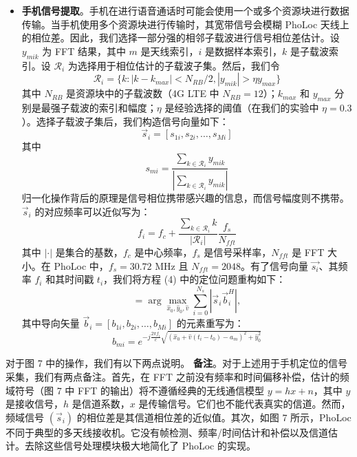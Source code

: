 \documentclass[journal, onecolumn]{IEEEtran}
\begin{document}
\begin{itemize}
    \item \textbf{手机信号提取}。手机在进行语音通话时可能会使用一个或多个资源块进行数据传输。当手机使用多个资源块进行传输时，其宽带信号会模糊 PhoLoc 天线上的相位差。因此，我们选择一部分强的相邻子载波进行信号相位差估计。设 $y_{mik}$ 为 FFT 结果，其中 $m$ 是天线索引，$i$ 是数据样本索引，$k$ 是子载波索引。设 $\mathcal{R}_{i}$ 为选择用于相位估计的子载波子集。然后，我们令
    \begin{equation}
    \mathcal{R}_{i}=\{k:|k-k_{max}|<N_{RB}/2,|y_{mik}|>\eta y_{max}\}
    \end{equation}
    其中 $N_{RB}$ 是资源块中的子载波数（4G LTE 中 $N_{RB}=12$）；$k_{max}$ 和 $y_{max}$ 分别是最强子载波的索引和幅度；$\eta$ 是经验选择的阈值（在我们的实验中 $\eta=0.3$）。选择子载波子集后，我们构造信号向量如下：
    \begin{equation}
    \vec{s}_{i}=[s_{1i},s_{2i},\dots,s_{Mi}]
    \end{equation}
    其中
    \begin{equation}
    s_{mi}=\frac{\sum_{k\in\mathcal{R}_{i}}y_{mik}}{|\sum_{k\in\mathcal{R}_{i}}y_{mik}|}
    \end{equation}
    归一化操作背后的原理是信号相位携带感兴趣的信息，而信号幅度则不携带。$\vec{s}_{i}$ 的对应频率可以近似写为：
    \begin{equation}
    f_{i}=f_{c}+\frac{\sum_{k\in\mathcal{R}_{i}}k}{|\mathcal{R}_{i}|}\frac{f_{s}}{N_{fft}}
    \end{equation}
    其中 $|\cdot|$ 是集合的基数，$f_{c}$ 是中心频率，$f_{s}$ 是信号采样率，$N_{fft}$ 是 FFT 大小。在 PhoLoc 中，$f_{s}=30.72$ MHz 且 $N_{fft}=2048$。有了信号向量 $\vec{s_{i}}$、其频率 $f_{i}$ 和其时间戳 $t_{i}$，我们将方程 (4) 中的定位问题重构如下：
    \begin{equation}
    [\hat{x}_{0}^{*},\hat{y}_{0}^{*},\hat{v}^{*}]= \arg \max_{\hat{x}_{0},\hat{y}_{0},\hat{v}}\sum_{i=0}^{N_{s}}|\vec{s}_{i}\vec{b}_{i}^{H}|,
    \end{equation}
    其中导向矢量 $\vec{b}_{i}=[b_{1i},b_{2i},\dots,b_{Mi}]$ 的元素重写为：
    \begin{equation}
    b_{mi}=e^{-j\frac{2\pi f_{i}}{c}\sqrt{(\hat{x}_{0}+\hat{v}(t_{i}-t_{0})-a_{m})^{2}+\hat{y}_{0}^{2}}}
    \end{equation}
\end{itemize}

对于图 7 中的操作，我们有以下两点说明。
\textbf{备注}。对于上述用于手机定位的信号采集，我们有两点备注。首先，在 FFT 之前没有频率和时间偏移补偿，估计的频域符号（图 7 中 FFT 的输出）将不遵循经典的无线通信模型 $y=hx+n$，其中 $y$ 是接收信号，$h$ 是信道系数，$x$ 是传输信号。它们也不能代表真实的信道。然而，频域信号 $(\vec{s}_{i})$ 的相位差是其信道相位差的近似值。其次，如图 7 所示，PhoLoc 不同于典型的多天线接收机。它没有帧检测、频率/时间估计和补偿以及信道估计。去除这些信号处理模块极大地简化了 PhoLoc 的实现。
\end{document}
